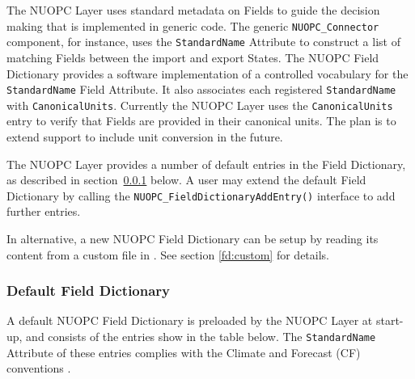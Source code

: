 %

\label{field_dictionary}

The NUOPC Layer uses standard metadata on Fields to guide the decision making that is implemented in generic code. The generic {\tt NUOPC\_Connector} component, for instance, uses the {\tt StandardName} Attribute to construct a list of matching Fields between the import and export States. The NUOPC Field Dictionary provides a software implementation of a controlled vocabulary for the {\tt StandardName} Field Attribute. It also associates each registered {\tt StandardName} with {\tt CanonicalUnits}. Currently the NUOPC Layer uses the {\tt CanonicalUnits} entry to verify that Fields are provided in their canonical units. The plan is to extend support to include unit conversion in the future.

The NUOPC Layer provides a number of default entries in the Field Dictionary, as described in section~\ref{fd:default} below. A user may extend the default Field Dictionary by calling the {\tt  NUOPC\_FieldDictionaryAddEntry()} interface to add further entries.

In alternative, a new NUOPC Field Dictionary can be setup by reading its content from a custom file in . See section \ref{fd:custom} for details.

\subsubsection{Default Field Dictionary}
\label{fd:default}

A default NUOPC Field Dictionary is preloaded by the NUOPC Layer at start-up, and consists of the entries show in the table below.
The {\tt StandardName} Attribute of these entries complies with the Climate and Forecast (CF) conventions .

